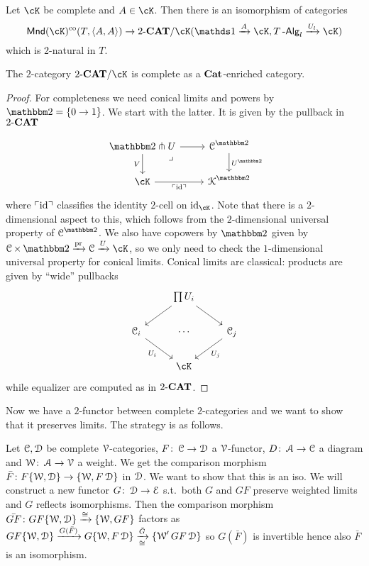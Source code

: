 \documentclass[a4paper,11pt,oneside,openany]{scrbook}
\begin{document}
\begin{prop}
    Let $\cK$ be complete and $A\in\cK$. Then there is an isomorphism of
    categories
    \[\Mnd(\cK)^{\text{co}}(T,\langle A,A \rangle)\rightarrow
    2\mbox{-}\CAT/\cK(\bb1\xrightarrow{A}\cK,T\Alg_l\xrightarrow{U_l}\cK)\]
    which is 2-natural in $T$.
\end{prop}
\begin{prop}
The $2$-category $2\mbox{-}\CAT/\cK$ is complete as a ${\normalfont\textbf{Cat}}$-enriched category.
\end{prop}
\begin{proof}
    For completeness we need conical limits and powers by $\b2=\{0\to1\}$. We start with the latter. It is given by the pullback in $2\mbox{-}{\normalfont\textbf{CAT}}$ 
    
    \[\begin{tikzcd}
\b2\pitchfork U \arrow[r] \arrow[d, "V"'] \arrow[rd, "\lrcorner", near start, phantom] & \C^{\b2} \arrow[d, "U^{\b2}"] \\
\cK \arrow[r, "\ulcorner\id\urcorner"']                                    & \K^{\b2}                     
\end{tikzcd}\]
where $\ulcorner\operatorname{id}\urcorner$ classifies the identity $2$-cell on $\id_{\cK}$. Note that there is a $2$-dimensional aspect to this, which follows from the $2$-dimensional universal property of $\C^{\b2}$. We also have copowers by $\b2$ given by $\C\times\b2\xrightarrow{\text{pr}}\C\xrightarrow{U}\cK$, so we only need to check the $1$-dimensional universal property for conical limits. Conical limits are classical: products are given by ``wide'' pullbacks 
\[\begin{tikzcd}
                                                     & \prod U_i \arrow[ld] \arrow[rd] &                        \\
\C_i \arrow[rd, "U_i"'] \arrow[rr, "\dots", phantom] &                                 & \C_j \arrow[ld, "U_j"] \\
                                                     & \cK                             &                       
\end{tikzcd}\]
while equalizer are computed as in $2\mbox{-}{\normalfont\textbf{CAT}}$.
\end{proof}
Now we have a $2$-functor between complete $2$-categories and we want to show that it preserves limits. The strategy is as follows. 

Let $\operatorname{\mathcal{C}},\operatorname{\mathcal{D}}$ be complete $\operatorname{\mathcal{V}}$-categories, $F\colon\operatorname{\mathcal{C}}\to\operatorname{\mathcal{D}}$ a $\operatorname{\mathcal{V}}$-functor, $D\colon\operatorname{\mathcal{A}}\to\operatorname{\mathcal{C}}$ a diagram and $\operatorname{\mathcal{W}}\colon\operatorname{\mathcal{A}}\to\operatorname{\mathcal{V}}$ a weight. We get the comparison morphism $\bar{F}\colon F\{\operatorname{\mathcal{W}},\operatorname{\mathcal{D}}\}\to\{\operatorname{\mathcal{W}}, F\operatorname{\mathcal{D}}\}$ in $\operatorname{\mathcal{D}}$. We want to show that this is an iso. We will construct a new functor $G\colon\operatorname{\mathcal{D}}\to\operatorname{\mathcal{E}}$ s.t.\ both $G$ and $GF$ preserve weighted limits and $G$ reflects isomorphisms. Then the comparison morphism $\bar{GF}\colon GF\{\operatorname{\mathcal{W}},\operatorname{\mathcal{D}}\}\xrightarrow{\cong}\{\operatorname{\mathcal{W}}, GF\}$ factors as $GF\{\operatorname{\mathcal{W}},\operatorname{\mathcal{D}}\}\xrightarrow{G(\bar{F})} G\{\operatorname{\mathcal{W}}, F\operatorname{\mathcal{D}}\}\xrightarrow[\cong]{\bar{G}}\{\operatorname{\mathcal{W}}'GF\operatorname{\mathcal{D}}\}$ so $G(\bar{F})$ is invertible hence also $\bar{F}$ is an isomorphism.
\end{document}
